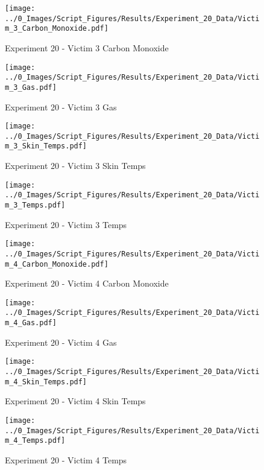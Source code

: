 	\begin{figure}[H]
		\centering
		\texttt{[image: ../0\_Images/Script\_Figures/Results/Experiment\_20\_Data/Victim\_3\_Carbon\_Monoxide.pdf]}
		\caption[]{Experiment 20 - Victim 3 Carbon Monoxide}
	\end{figure}
 
	\clearpage

	\begin{figure}[H]
		\centering
		\texttt{[image: ../0\_Images/Script\_Figures/Results/Experiment\_20\_Data/Victim\_3\_Gas.pdf]}
		\caption[]{Experiment 20 - Victim 3 Gas}
	\end{figure}
 

	\begin{figure}[H]
		\centering
		\texttt{[image: ../0\_Images/Script\_Figures/Results/Experiment\_20\_Data/Victim\_3\_Skin\_Temps.pdf]}
		\caption[]{Experiment 20 - Victim 3 Skin Temps}
	\end{figure}
 
	\clearpage

	\begin{figure}[H]
		\centering
		\texttt{[image: ../0\_Images/Script\_Figures/Results/Experiment\_20\_Data/Victim\_3\_Temps.pdf]}
		\caption[]{Experiment 20 - Victim 3 Temps}
	\end{figure}
 

	\begin{figure}[H]
		\centering
		\texttt{[image: ../0\_Images/Script\_Figures/Results/Experiment\_20\_Data/Victim\_4\_Carbon\_Monoxide.pdf]}
		\caption[]{Experiment 20 - Victim 4 Carbon Monoxide}
	\end{figure}
 
	\clearpage

	\begin{figure}[H]
		\centering
		\texttt{[image: ../0\_Images/Script\_Figures/Results/Experiment\_20\_Data/Victim\_4\_Gas.pdf]}
		\caption[]{Experiment 20 - Victim 4 Gas}
	\end{figure}
 

	\begin{figure}[H]
		\centering
		\texttt{[image: ../0\_Images/Script\_Figures/Results/Experiment\_20\_Data/Victim\_4\_Skin\_Temps.pdf]}
		\caption[]{Experiment 20 - Victim 4 Skin Temps}
	\end{figure}
 
	\clearpage

	\begin{figure}[H]
		\centering
		\texttt{[image: ../0\_Images/Script\_Figures/Results/Experiment\_20\_Data/Victim\_4\_Temps.pdf]}
		\caption[]{Experiment 20 - Victim 4 Temps}
	\end{figure}
 

